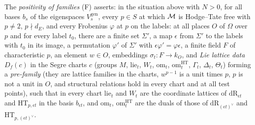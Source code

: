 \begin{definition}\label{pf:towergeo:def-fam}
The \emph{positivity of families} \textup{(F)} asserts: in the situation above with $N>0$, for all bases
$b_s$ of the eigenspaces $V^{\mathrm{gen}}_s$, every $p\in S$ at which $\mathcal M$ is Hodge--Tate free with
$p\ne2$, $p\nmid d_E$, and every Frobenius $\varphi$ at $p$ on the labels: at all places $O$ of $\Omega$
over $p$ and for every label $t_0$, there are a finite set $\Sigma'$, a map $\epsilon$ from $\Sigma'$ to the
labels with $t_0$ in its image, a permutation $\varphi'$ of $\Sigma'$ with $\epsilon\varphi'=\varphi\epsilon$,
a finite field $F$ of characteristic $p$, an element $w\in O$, embeddings $\sigma_t\colon F\to k_O$, and
\emph{Lie lattice data} $D_f(c)$ in the Segre charts $c$ (groups $M$, $\mathrm{lie}_t$, $W_t$,
$\mathrm{om}_t$, $\mathrm{om}^{\mathrm{HT}}_t$, $\Gamma_t$, $\Delta_t$, $\Theta_t$) forming a
\emph{pre-family} (they are lattice families in the charts, $w^{p-1}$ is a unit times $p$, $p$ is not a
unit in $O$, and structural relations hold in every chart and at all test points), such that in every
chart $\mathrm{lie}_t$ and $W_t$ are the coordinate lattices of $\mathrm{dR}_{\epsilon t}$ and
$\mathrm{HT}_{p,\epsilon t}$ in the basis $b_{\epsilon t}$, and $\mathrm{om}_t$, $\mathrm{om}^{\mathrm{HT}}_t$
are the duals of those of $\mathrm{dR}_{(\epsilon t)^\vee}$ and $\mathrm{HT}_{p,(\epsilon t)^\vee}$.
\end{definition}

